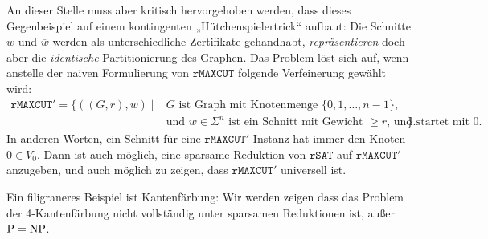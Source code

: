 An dieser Stelle muss aber kritisch hervorgehoben werden, dass dieses Gegenbeispiel auf einem kontingenten „Hütchenspielertrick“ aufbaut: Die Schnitte $w$ und $\overline{w}$ werden als unterschiedliche Zertifikate gehandhabt, \emph{repräsentieren} doch aber die \emph{identische} Partitionierung des Graphen.
Das Problem löst sich auf, wenn anstelle der naiven Formulierung von $\mathtt{rMAXCUT}$ folgende Verfeinerung gewählt wird:
\[ \begin{split} \mathtt{rMAXCUT'} = \{ ((G, r), w) \mid {}&\text{$G$ ist Graph mit Knotenmenge $\{0,1,\dots,n-1\}$,} \\ &\text{und $w\in\Sigma^n$ ist ein Schnitt mit Gewicht $\geq r$, und startet mit $0$.} \}.\end{split} \]
In anderen Worten, ein Schnitt für eine $\mathtt{rMAXCUT'}$-Instanz hat immer den Knoten $0\in V_0$.
Dann ist auch möglich, eine sparsame Reduktion von $\mathtt{rSAT}$ auf $\mathtt{rMAXCUT'}$ anzugeben, und auch möglich zu zeigen, dass $\mathtt{rMAXCUT'}$ universell ist.

Ein filigraneres Beispiel ist Kantenfärbung:  Wir werden zeigen dass das Problem der 4-Kantenfärbung nicht vollständig unter sparsamen Reduktionen ist, außer $\mathrm{P}=\mathrm{NP}$.

